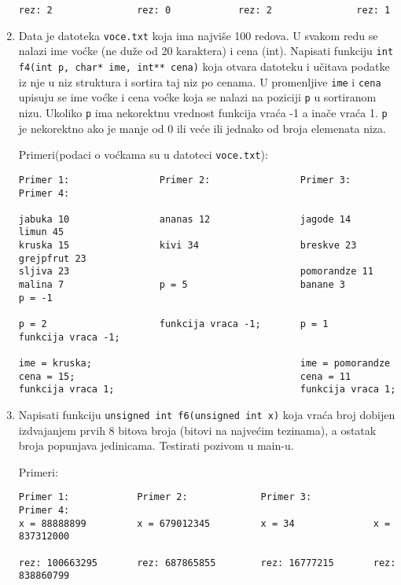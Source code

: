\begin{enumerate}
\begin{verbatim}
rez: 2               rez: 0            rez: 2               rez: 1
\end{verbatim}

\item
Data je
datoteka \verb|voce.txt| koja ima najvi\v se 100 redova. U svakom redu se nalazi ime vo\'cke (ne du\v ze od 20 karaktera) i cena (int).
Napisati funkciju \verb|int f4(int p, char* ime, int** cena)| koja otvara datoteku i u\v citava podatke iz nje u niz struktura i
sortira taj niz po cenama. U promenljive \verb|ime| i \verb|cena| upisuju se ime vo\' cke i cena vo\' cke koja se nalazi na poziciji \verb|p| u sortiranom nizu. Ukoliko  \verb|p| ima nekorektnu vrednost funkcija vra\'ca -1
a ina\v ce vra\'ca 1. \verb|p| je nekorektno ako je manje od 0 ili ve\'ce ili jednako od broja elemenata niza.


Primeri(podaci o vo\'ckama su u datoteci \verb|voce.txt|):
\begin{verbatim}
Primer 1:                Primer 2:                Primer 3:               Primer 4:

jabuka 10                ananas 12                jagode 14               limun 45
kruska 15                kivi 34                  breskve 23              grejpfrut 23
sljiva 23                                         pomorandze 11
malina 7                 p = 5                    banane 3                p = -1

p = 2                    funkcija vraca -1;       p = 1                   funkcija vraca -1;

ime = kruska;                                     ime = pomorandze
cena = 15;                                        cena = 11
funkcija vraca 1;                                 funkcija vraca 1;
\end{verbatim}

\item
Napisati funkciju \verb|unsigned int f6(unsigned int x)| koja
vra\' ca broj dobijen izdvajanjem prvih 8 bitova broja (bitovi na najve\'cim tezinama), a ostatak
broja popunjava jedinicama. Testirati pozivom u main-u.


Primeri:
\begin{verbatim}
Primer 1:            Primer 2:             Primer 3:           Primer 4:
x = 88888899         x = 679012345         x = 34              x = 837312000

rez: 100663295       rez: 687865855        rez: 16777215       rez: 838860799

\end{verbatim}


\end{enumerate}
